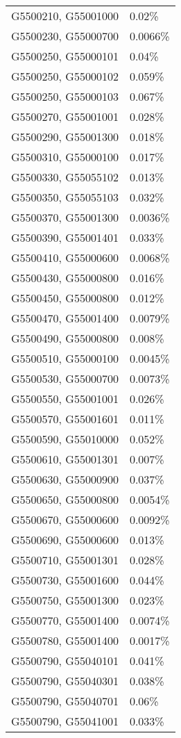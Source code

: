 \begin{longtable}[]{@{}ll@{}}
G5500210, G55001000 & 0.02\% \\
G5500230, G55000700 & 0.0066\% \\
G5500250, G55000101 & 0.04\% \\
G5500250, G55000102 & 0.059\% \\
G5500250, G55000103 & 0.067\% \\
G5500270, G55001001 & 0.028\% \\
G5500290, G55001300 & 0.018\% \\
G5500310, G55000100 & 0.017\% \\
G5500330, G55055102 & 0.013\% \\
G5500350, G55055103 & 0.032\% \\
G5500370, G55001300 & 0.0036\% \\
G5500390, G55001401 & 0.033\% \\
G5500410, G55000600 & 0.0068\% \\
G5500430, G55000800 & 0.016\% \\
G5500450, G55000800 & 0.012\% \\
G5500470, G55001400 & 0.0079\% \\
G5500490, G55000800 & 0.008\% \\
G5500510, G55000100 & 0.0045\% \\
G5500530, G55000700 & 0.0073\% \\
G5500550, G55001001 & 0.026\% \\
G5500570, G55001601 & 0.011\% \\
G5500590, G55010000 & 0.052\% \\
G5500610, G55001301 & 0.007\% \\
G5500630, G55000900 & 0.037\% \\
G5500650, G55000800 & 0.0054\% \\
G5500670, G55000600 & 0.0092\% \\
G5500690, G55000600 & 0.013\% \\
G5500710, G55001301 & 0.028\% \\
G5500730, G55001600 & 0.044\% \\
G5500750, G55001300 & 0.023\% \\
G5500770, G55001400 & 0.0074\% \\
G5500780, G55001400 & 0.0017\% \\
G5500790, G55040101 & 0.041\% \\
G5500790, G55040301 & 0.038\% \\
G5500790, G55040701 & 0.06\% \\
G5500790, G55041001 & 0.033\% \\

\end{longtable}
